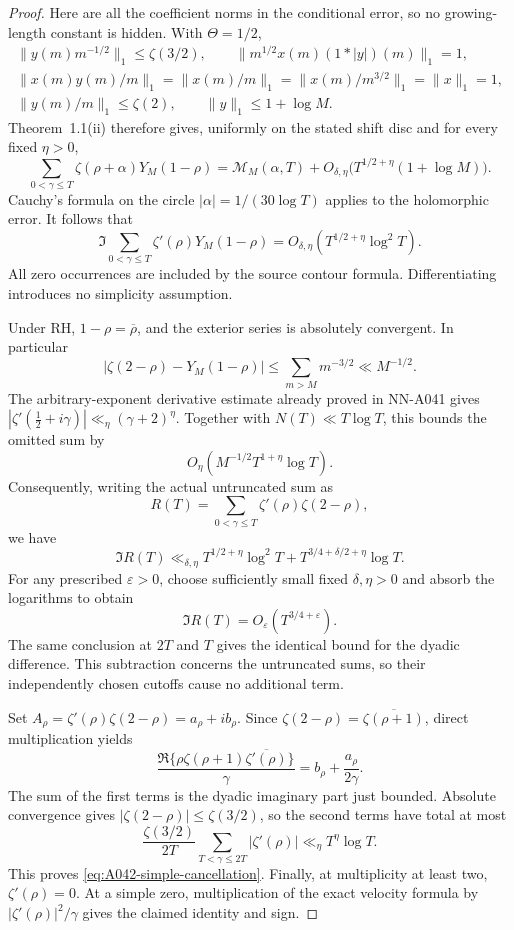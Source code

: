 \begin{proof}
Here are all the coefficient norms in the conditional error,
so no growing-length constant is hidden. With $\Theta=1/2$,
\begin{gather*}
 \|y(m)m^{-1/2}\|_1\le\zeta(3/2),\qquad
 \|m^{1/2}x(m)(1*|y|)(m)\|_1=1,\\
 \|x(m)y(m)/m\|_1
 =\|x(m)/m\|_1
 =\|x(m)/m^{3/2}\|_1
 =\|x\|_1=1,\\
 \|y(m)/m\|_1\le\zeta(2),\qquad
 \|y\|_1\le1+\log M.
\end{gather*}
Theorem~1.1(ii) therefore gives, uniformly on the stated
shift disc and for every fixed $\eta>0$,
\[
 \sum_{0<\gamma\le T}\zeta(\rho+\alpha)Y_M(1-\rho)
       =\mathcal M_M(\alpha,T)
          +O_{\delta,\eta}
                  \bigl(T^{1/2+\eta}(1+\log M)\bigr).
\]
Cauchy's formula on the circle
$|\alpha|=1/(30\log T)$ applies to the holomorphic error.
It follows that
\begin{equation}\label{eq:A042-imaginary-truncated}
 \Im\sum_{0<\gamma\le T}\zeta'(\rho)Y_M(1-\rho)
      =O_{\delta,\eta}(T^{1/2+\eta}\log^2T).
\end{equation}
All zero occurrences are included by the source contour
formula. Differentiating introduces no simplicity assumption.

Under RH, $1-\rho=\overline\rho$, and the exterior series is
absolutely convergent. In particular
\[
 \bigl|\zeta(2-\rho)-Y_M(1-\rho)\bigr|
       \le\sum_{m>M}m^{-3/2}\ll M^{-1/2}.
\]
The arbitrary-exponent derivative estimate already proved
in NN-A041 gives
$|\zeta'(\tfrac12+i\gamma)|\ll_\eta(\gamma+2)^\eta$.
Together with $N(T)\ll T\log T$, this bounds the omitted sum by
\[
              O_\eta(M^{-1/2}T^{1+\eta}\log T).
\]
Consequently, writing the actual untruncated sum as
\[
 R(T)=\sum_{0<\gamma\le T}\zeta'(\rho)\zeta(2-\rho),
\]
we have
\[
 \Im R(T)\ll_{\delta,\eta}
 T^{1/2+\eta}\log^2T+
 T^{3/4+\delta/2+\eta}\log T.
\]
For any prescribed $\varepsilon>0$, choose sufficiently small
fixed $\delta,\eta>0$ and absorb the logarithms to obtain
\[
                  \Im R(T)=O_\varepsilon(T^{3/4+\varepsilon}).
\]
The same conclusion at $2T$ and $T$ gives the identical
bound for the dyadic difference. This subtraction concerns
the untruncated sums, so their independently chosen cutoffs
cause no additional term.

Set $A_\rho=\zeta'(\rho)\zeta(2-\rho)=a_\rho+i b_\rho$.
Since $\zeta(2-\rho)=\overline{\zeta(\rho+1)}$,
direct multiplication yields
\[
 \frac{\Re\{\rho\zeta(\rho+1)\overline{\zeta'(\rho)}\}}{\gamma}
                       =b_\rho+\frac{a_\rho}{2\gamma}.
\]
The sum of the first terms is the dyadic imaginary part
just bounded. Absolute convergence gives
$|\zeta(2-\rho)|\le\zeta(3/2)$, so the second terms have
total at most
\[
 \frac{\zeta(3/2)}{2T}
       \sum_{T<\gamma\le2T}|\zeta'(\rho)|
             \ll_\eta T^\eta\log T.
\]
This proves \eqref{eq:A042-simple-cancellation}.
Finally, at multiplicity at least two, $\zeta'(\rho)=0$.
At a simple zero, multiplication of the exact velocity
formula by $|\zeta'(\rho)|^2/\gamma$ gives the claimed
identity and sign.
\end{proof}

